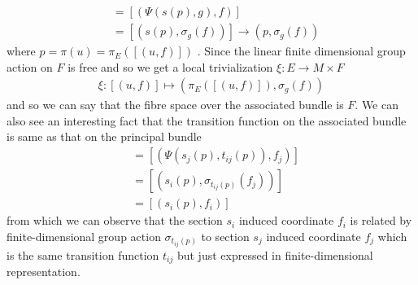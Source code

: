\documentclass[12pt]{article}
\begin{document}
\begin{align*}
    [(u, f)] &= [(\Psi(s(p), g), f)] \\
             &= [(s(p), \sigma_{g}(f))] \to (p, \sigma_{g}(f))
\end{align*}where $p = \pi(u) = \pi_{E}([(u, f)])$ . Since the linear finite dimensional group action on $F$ is free and so we get a local trivialization $\xi\colon E\to M\times F$
\begin{align*}
    \xi\colon [(u, f)]\mapsto (\pi_{E}([(u, f)]), \sigma_{g}(f))
\end{align*} and so we can say that the fibre space over the associated bundle is $F$. We can also see an interesting fact that the transition function on the associated bundle is same as that on the principal bundle
\begin{align*}
    [(s_{j}(p), f_{j})] &= [(\Psi(s_{j}(p), t_{ij}(p)), f_{j})] \\
                    &= [(s_{i}(p), \sigma_{t_{ij}(p)}(f_{j}))] \\
                    &= [(s_{i}(p), f_{i})]
\end{align*} from which we can observe that the section $s_{i}$ induced coordinate $f_{i}$ is related by finite-dimensional group action $\sigma_{t_{ij}(p)}$ to section $s_{j}$ induced coordinate $f_{j}$ which is the same transition function $t_{ij}$ but just expressed in finite-dimensional representation. 
\end{document}
